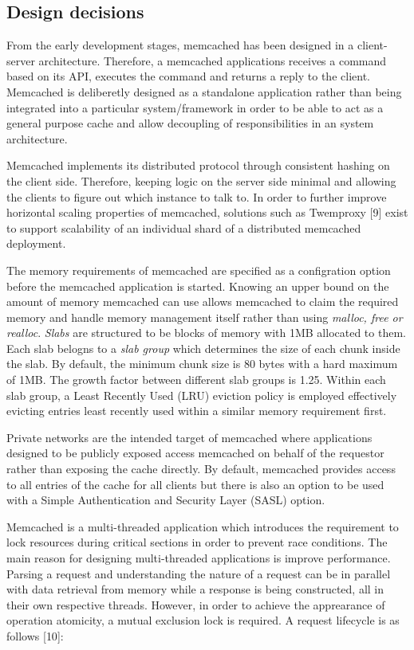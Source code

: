 \subsection{Design decisions}\label{design-decisions}

From the early development stages, memcached has been designed in a
client-server architecture. Therefore, a memcached applications receives
a command based on its API, executes the command and returns a reply to
the client. Memcached is deliberetly designed as a standalone
application rather than being integrated into a particular
system/framework in order to be able to act as a general purpose cache
and allow decoupling of responsibilities in an system architecture.

Memcached implements its distributed protocol through consistent hashing
on the client side. Therefore, keeping logic on the server side minimal
and allowing the clients to figure out which instance to talk to. In
order to further improve horizontal scaling properties of memcached,
solutions such as Twemproxy {[}9{]} exist to support scalability of an
individual shard of a distributed memcached deployment.

The memory requirements of memcached are specified as a configration
option before the memcached application is started. Knowing an upper
bound on the amount of memory memcached can use allows memcached to
claim the required memory and handle memory management itself rather
than using \emph{malloc, free or realloc}. \emph{Slabs} are structured
to be blocks of memory with 1MB allocated to them. Each slab belogns to
a \emph{slab group} which determines the size of each chunk inside the
slab. By default, the minimum chunk size is 80 bytes with a hard maximum
of 1MB. The growth factor between different slab groups is 1.25. Within
each slab group, a Least Recently Used (LRU) eviction policy is employed
effectively evicting entries least recently used within a similar memory
requirement first.

Private networks are the intended target of memcached where applications
designed to be publicly exposed access memcached on behalf of the
requestor rather than exposing the cache directly. By default, memcached
provides access to all entries of the cache for all clients but there is
also an option to be used with a Simple Authentication and Security
Layer (SASL) option.

Memcached is a multi-threaded application which introduces the
requirement to lock resources during critical sections in order to
prevent race conditions. The main reason for designing multi-threaded
applications is improve performance. Parsing a request and understanding
the nature of a request can be in parallel with data retrieval from
memory while a response is being constructed, all in their own
respective threads. However, in order to achieve the apprearance of
operation atomicity, a mutual exclusion lock is required. A request
lifecycle is as follows {[}10{]}:

